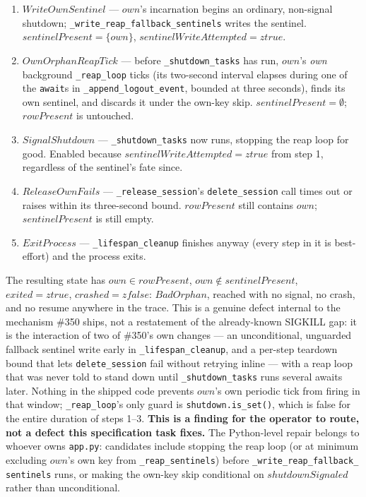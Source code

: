 \documentclass[a4paper,10pt,fleqn]{article}
\begin{document}
\begin{enumerate}
  \item $WriteOwnSentinel$ --- $own$'s incarnation begins an ordinary,
    non-signal shutdown; \texttt{\_write\_reap\_fallback\_sentinels}
    writes the sentinel.  $sentinelPresent = \{ own \}$,
    $sentinelWriteAttempted = ztrue$.
  \item $OwnOrphanReapTick$ --- before \texttt{\_shutdown\_tasks} has
    run, $own$'s \emph{own} background \texttt{\_reap\_loop} ticks
    (its two-second interval elapses during one of the \texttt{await}s
    in \texttt{\_append\_logout\_event}, bounded at three seconds), finds its own
    sentinel, and discards it under the own-key skip.
    $sentinelPresent = \emptyset$; $rowPresent$ is untouched.
  \item $SignalShutdown$ --- \texttt{\_shutdown\_tasks} now runs,
    stopping the reap loop for good.  Enabled because
    $sentinelWriteAttempted = ztrue$ from step 1, regardless of the
    sentinel's fate since.
  \item $ReleaseOwnFails$ --- \texttt{\_release\_session}'s
    \texttt{delete\_session} call times out or raises within its
    three-second bound.  $rowPresent$ still contains $own$;
    $sentinelPresent$ is still empty.
  \item $ExitProcess$ --- \texttt{\_lifespan\_cleanup} finishes anyway
    (every step in it is best-effort) and the process exits.
\end{enumerate}

The resulting state has $own \in rowPresent$, $own \notin
sentinelPresent$, $exited = ztrue$, $crashed = zfalse$: $BadOrphan$,
reached with no signal, no crash, and no resume anywhere in the trace.
This is a genuine defect internal to the mechanism \#350 ships, not a
restatement of the already-known SIGKILL gap: it is the interaction of
two of \#350's own changes --- an unconditional, unguarded fallback
sentinel write early in \texttt{\_lifespan\_cleanup}, and a per-step
teardown bound that lets \texttt{delete\_session} fail without
retrying inline --- with a reap loop that was never told to stand down
until \texttt{\_shutdown\_tasks} runs several awaits later.  Nothing in
the shipped code prevents $own$'s own periodic tick from firing in that
window; \texttt{\_reap\_loop}'s only guard is
\texttt{shutdown.is\_set()}, which is false for the entire duration of
steps 1--3.  \textbf{This is a finding for the operator to route, not a
defect this specification task fixes.}  The Python-level repair belongs
to whoever owns \texttt{app.py}: candidates include stopping the reap
loop (or at minimum excluding $own$'s own key from
\texttt{\_reap\_sentinels}) before \texttt{\_write\_reap\_fallback\_
sentinels} runs, or making the own-key skip conditional on
$shutdownSignaled$ rather than unconditional.
\end{document}
